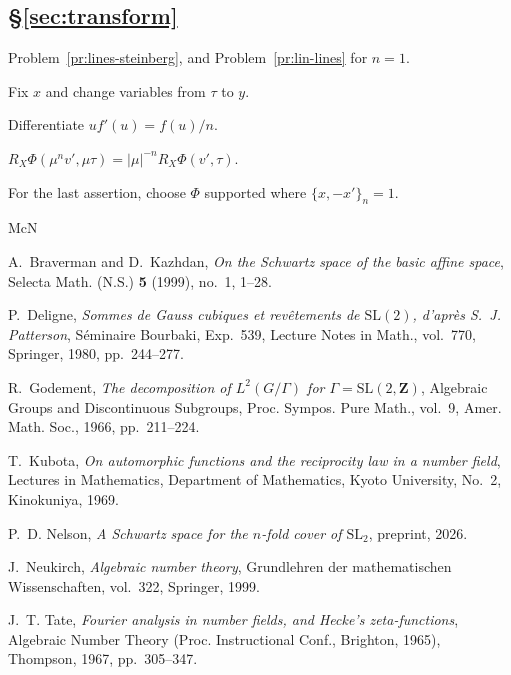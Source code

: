 \documentclass[reqno]{amsart}
\numberwithin{equation}{section}
\theoremstyle{definition}
\theoremstyle{plain}
\newenvironment{hints}{\begin{description}[font=\normalfont\bfseries]}{\end{description}}
\begin{document}
\subsection*{\S\ref{sec:transform}}
\begin{hints}
\item[\ref{pr:ft-genuine}] Problem~\ref{pr:lines-steinberg}, and Problem~\ref{pr:lin-lines} for $n = 1$.
\item[\ref{pr:ft-kernel}] Fix $x$ and change variables from $\tau$ to $y$.
\item[\ref{pr:ft-half-density}] Differentiate $u f'(u) = f(u) / n$.
\item[\ref{pr:ft-root}] $R_X \Phi(\mu^n v', \mu \tau) = \lvert \mu \rvert^{-n} R_X \Phi(v', \tau)$.
\item[\ref{pr:schwartz-not-D}] For the last assertion, choose $\Phi$ supported where $\{x, -x'\}_n = 1$.
\end{hints}

\begin{thebibliography}{McN}

A.~Braverman and D.~Kazhdan, \emph{On the {S}chwartz space of the basic affine space}, Selecta Math. (N.S.) \textbf{5} (1999), no.~1, 1--28.

P.~Deligne, \emph{Sommes de {G}auss cubiques et rev\^etements de {$\mathrm{SL}(2)$}, d'apr\`es {S}.~{J}. {P}atterson}, S\'eminaire Bourbaki, Exp.~539, Lecture Notes in Math., vol.~770, Springer, 1980, pp.~244--277.

R.~Godement, \emph{The decomposition of {$L^2(G/\Gamma)$} for {$\Gamma = \mathrm{SL}(2, \mathbf{Z})$}}, Algebraic Groups and Discontinuous Subgroups, Proc. Sympos. Pure Math., vol.~9, Amer. Math. Soc., 1966, pp.~211--224.

T.~Kubota, \emph{On automorphic functions and the reciprocity law in a number field}, Lectures in Mathematics, Department of Mathematics, Kyoto University, No.~2, Kinokuniya, 1969.

P.~D. Nelson, \emph{A {S}chwartz space for the $n$-fold cover of $\mathrm{SL}_2$}, preprint, 2026.

J.~Neukirch, \emph{Algebraic number theory}, Grundlehren der mathematischen Wissenschaften, vol.~322, Springer, 1999.

J.~T. Tate, \emph{Fourier analysis in number fields, and {H}ecke's zeta-functions}, Algebraic Number Theory (Proc. Instructional Conf., Brighton, 1965), Thompson, 1967, pp.~305--347.

\end{thebibliography}
\end{document}
